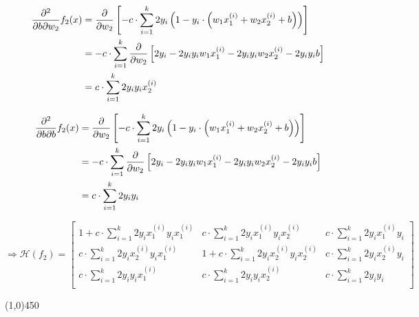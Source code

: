 \documentclass[12pt,landscape]{article}
\newcommand{\hr}{\begin{center} \line(1,0){450} \end{center}}
\begin{document}
\begin{align}
\frac{\partial^2}{\partial b \partial w_2}  f_2(x) 
&= \frac{\partial}{\partial w_2} \left[ - c \cdot \sum\limits_{i=1}^k 2 y_i \left( 1-y_i \cdot \left( w_1 x_1^{(i)} + w_2 x_2^{(i)} + b\right) \right) \right]\nonumber\\
&= - c \cdot \sum\limits_{i=1}^k  \frac{\partial}{\partial w_2} \left[    2 y_i- 2 y_i y_i  w_1  x_1^{(i)}  - 2 y_i y_i w_2  x_2^{(i)}  - 2 y_i y_i b \right] \\\nonumber
&=  c \cdot \sum\limits_{i=1}^k 2 y_i y_i  x_2^{(i)}   \nonumber
\end{align}

\begin{align}
\frac{\partial^2}{\partial b \partial b} f_2(x)
&= \frac{\partial}{\partial w_2} \left[ - c \cdot \sum\limits_{i=1}^k 2 y_i \left( 1-y_i \cdot \left( w_1 x_1^{(i)} + w_2 x_2^{(i)} + b\right) \right) \right]\nonumber\\
&= - c \cdot \sum\limits_{i=1}^k  \frac{\partial}{\partial w_2} \left[    2 y_i- 2 y_i y_i  w_1  x_1^{(i)}  - 2 y_i y_i w_2  x_2^{(i)}  - 2 y_i y_i b \right] \\\nonumber
&=  c \cdot \sum\limits_{i=1}^k 2 y_i y_i \nonumber
\end{align}

\newcommand{\lTwoDOneDOne}{1 +   c \cdot \sum\limits_{i=1}^k 2y_i  x_1^{(i)}y_i  x_1^{(i)}}
\newcommand{\lTwoDOneDTwo}{c \cdot \sum\limits_{i=1}^k 2y_i  x_1^{(i)}y_i  x_2^{(i)}}
\newcommand{\lTwoDOneDb}{c \cdot \sum\limits_{i=1}^k 2y_i  x_1^{(i)}y_i}
\newcommand{\lTwoDTwoDOne}{c \cdot \sum\limits_{i=1}^k 2y_i  x_2^{(i)}y_i  x_1^{(i)} }
\newcommand{\lTwoDTwoDTwo}{1 +  c \cdot \sum\limits_{i=1}^k 2y_i  x_2^{(i)}y_i x_2^{(i)}}
\newcommand{\lTwoDTwoDb}{c \cdot \sum\limits_{i=1}^k  2y_i  x_2^{(i)}y_i}
\newcommand{\lTwoDbDOne}{c \cdot \sum\limits_{i=1}^k 2 y_i y_i  x_1^{(i)}}
\newcommand{\lTwoDbDTwo}{c \cdot \sum\limits_{i=1}^k 2 y_i y_i  x_2^{(i)}}
\newcommand{\lTwoDbDb}{c \cdot \sum\limits_{i=1}^k 2 y_i y_i}

\begin{equation}
\Rightarrow \mathcal{H}(f_2) = \begin{bmatrix}
\lTwoDOneDOne & \lTwoDOneDTwo & \lTwoDOneDb\\
\lTwoDTwoDOne & \lTwoDTwoDTwo & \lTwoDTwoDb\\
\lTwoDbDOne & \lTwoDbDTwo & \lTwoDbDb\\
\end{bmatrix}
\end{equation}



\hr
\end{document}
